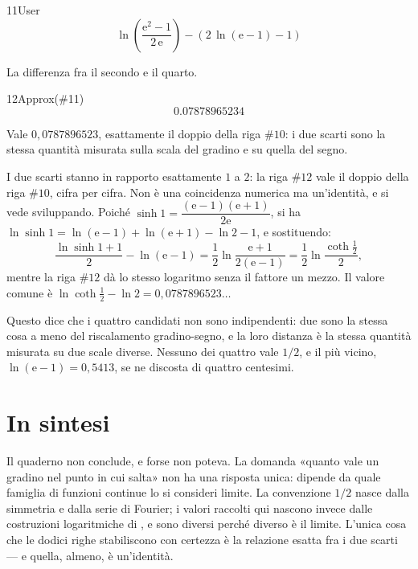 \begin{espr}{11}{User}{}
\[
\ln\!\left(\frac{\mathrm{e}^{2} - 1}{2\, \mathrm{e}}\right) - \left(2\, \ln\!\left(\mathrm{e} - 1\right) - 1\right)
\]
\end{espr}
La differenza fra il secondo e il quarto.

\begin{espr}{12}{Approx(\#11)}{}
\[
0.07878965234
\]
\end{espr}
Vale $0{,}0787896523$, esattamente il doppio della riga $\#10$: i due scarti sono la stessa quantità misurata sulla scala del gradino e su quella del segno.


I due scarti stanno in rapporto esattamente $1$ a $2$: la riga $\#12$ vale il doppio della riga $\#10$, cifra per cifra. Non è una coincidenza numerica ma un'identità, e si vede sviluppando. Poiché $\sinh1=\dfrac{(\mathrm{e}-1)(\mathrm{e}+1)}{2\mathrm{e}}$, si ha $\ln\sinh1=\ln(\mathrm{e}-1)+\ln(\mathrm{e}+1)-\ln2-1$, e sostituendo:
\[
  \frac{\ln\sinh 1+1}{2}-\ln(\mathrm{e}-1)
  =\frac{1}{2}\ln\frac{\mathrm{e}+1}{2(\mathrm{e}-1)}
  =\frac{1}{2}\ln\frac{\coth\tfrac12}{2},
\]
mentre la riga $\#12$ dà lo stesso logaritmo senza il fattore un mezzo. Il valore comune è $\ln\coth\tfrac12-\ln2=0{,}0787896523\ldots$

Questo dice che i quattro candidati non sono indipendenti: due sono la stessa cosa a meno del riscalamento gradino-segno, e la loro distanza è la stessa quantità misurata su due scale diverse. Nessuno dei quattro vale $1/2$, e il più vicino, $\ln(\mathrm{e}-1)=0{,}5413$, se ne discosta di quattro centesimi.

\section*{In sintesi}

Il quaderno non conclude, e forse non poteva. La domanda «quanto vale un gradino nel punto in cui salta» non ha una risposta unica: dipende da quale famiglia di funzioni continue lo si consideri limite. La convenzione $1/2$ nasce dalla simmetria e dalla serie di Fourier; i valori raccolti qui nascono invece dalle costruzioni logaritmiche di , e sono diversi perché diverso è il limite. L'unica cosa che le dodici righe stabiliscono con certezza è la relazione esatta fra i due scarti — e quella, almeno, è un'identità.

